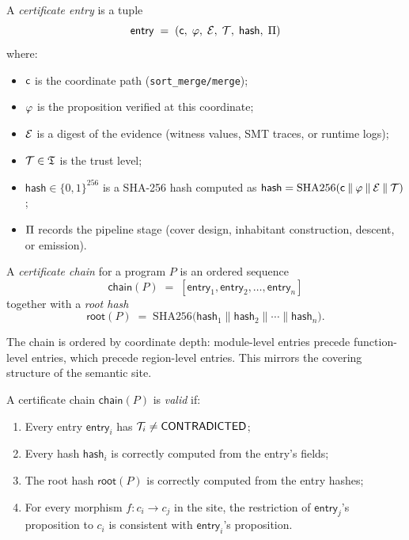 \documentclass[11pt]{article}
\newcommand{\certchain}{\mathsf{chain}}
\newcommand{\certhash}{\mathsf{hash}}
\newcommand{\certentry}{\mathsf{entry}}
\newcommand{\certroot}{\mathsf{root}}
\begin{document}
\begin{definition}\label{def:cert-entry}
A \emph{certificate entry} is a tuple
\[
  \certentry \;=\;
  (\coord,\;\prop,\;\evid,\;\trust,\;\certhash,\;\prov)
\]
where:
\begin{itemize}
  \item $\mathsf{c}$ is the coordinate path (\eg \texttt{sort\_merge/merge});
  \item $\varphi$ is the proposition verified at this coordinate;
  \item $\mathcal{E}$ is a digest of the evidence (witness values, SMT
    traces, or runtime logs);
  \item $\mathcal{T} \in \mathfrak{T}$ is the trust level;
  \item $\certhash \in \{0,1\}^{256}$ is a SHA-256 hash computed as
    $\certhash = \mathrm{SHA256}(\coord \mathbin\| \prop \mathbin\|
    \evid \mathbin\| \trust)$;
  \item $\Pi$ records the pipeline stage (cover design, inhabitant
    construction, descent, or emission).
\end{itemize}
\end{definition}

\begin{definition}\label{def:cert-chain}
A \emph{certificate chain} for a program $P$ is an ordered sequence
\[
  \certchain(P) \;=\; [\certentry_1, \certentry_2, \ldots, \certentry_n]
\]
together with a \emph{root hash}
\[
  \certroot(P) \;=\; \mathrm{SHA256}\bigl(
    \certhash_1 \mathbin\| \certhash_2 \mathbin\| \cdots \mathbin\|
    \certhash_n\bigr).
\]
\end{definition}

The chain is ordered by coordinate depth: module-level entries
precede function-level entries, which precede region-level entries.
This mirrors the covering structure of the semantic site.

\begin{definition}\label{def:chain-valid}
A certificate chain $\certchain(P)$ is \emph{valid} if:
\begin{enumerate}[label=(\alph*)]
  \item Every entry $\certentry_i$ has $\mathcal{T}_i \neq \mathsf{CONTRADICTED}$;
  \item Every hash $\certhash_i$ is correctly computed from the
    entry's fields;
  \item The root hash $\certroot(P)$ is correctly computed from the
    entry hashes;
  \item For every morphism $f : c_i \to c_j$ in the site, the
    restriction of $\certentry_j$'s proposition to $c_i$ is
    consistent with $\certentry_i$'s proposition.
\end{enumerate}
\end{definition}
\end{document}
